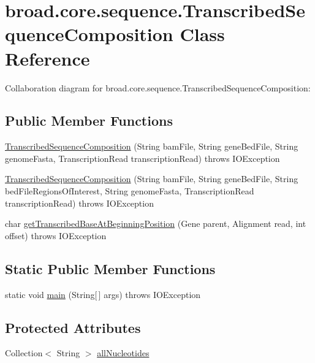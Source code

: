 \hypertarget{classbroad_1_1core_1_1sequence_1_1_transcribed_sequence_composition}{\section{broad.\+core.\+sequence.\+Transcribed\+Sequence\+Composition Class Reference}
\label{classbroad_1_1core_1_1sequence_1_1_transcribed_sequence_composition}
}


Collaboration diagram for broad.\+core.\+sequence.\+Transcribed\+Sequence\+Composition\+:
\subsection*{Public Member Functions}
\begin{DoxyCompactItemize}
\item 
\hyperlink{classbroad_1_1core_1_1sequence_1_1_transcribed_sequence_composition_ae9455cd7053b985e3e51243b0b77d644}{Transcribed\+Sequence\+Composition} (String bam\+File, String gene\+Bed\+File, String genome\+Fasta, Transcription\+Read transcription\+Read)  throws I\+O\+Exception 
\item 
\hyperlink{classbroad_1_1core_1_1sequence_1_1_transcribed_sequence_composition_ab12ddbcae5506733fc1031523e0ab8f0}{Transcribed\+Sequence\+Composition} (String bam\+File, String gene\+Bed\+File, String bed\+File\+Regions\+Of\+Interest, String genome\+Fasta, Transcription\+Read transcription\+Read)  throws I\+O\+Exception 
\item 
char \hyperlink{classbroad_1_1core_1_1sequence_1_1_transcribed_sequence_composition_a1ac885628c31fd901c8dbe3494de0e55}{get\+Transcribed\+Base\+At\+Beginning\+Position} (Gene parent, Alignment read, int offset)  throws I\+O\+Exception 
\end{DoxyCompactItemize}
\subsection*{Static Public Member Functions}
\begin{DoxyCompactItemize}
\item 
static void \hyperlink{classbroad_1_1core_1_1sequence_1_1_transcribed_sequence_composition_ac14fe8aa4e8d4daa8429cef414e654a8}{main} (String\mbox{[}$\,$\mbox{]} args)  throws I\+O\+Exception 
\end{DoxyCompactItemize}
\subsection*{Protected Attributes}
\begin{DoxyCompactItemize}
\item 
Collection$<$ String $>$ \hyperlink{classbroad_1_1core_1_1sequence_1_1_transcribed_sequence_composition_a4fb033e07d832446aed4745cdcee9241}{all\+Nucleotides}
\end{DoxyCompactItemize}


